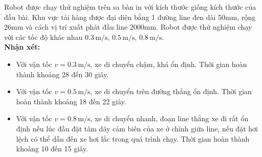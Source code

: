           \hspace*{0.6cm}Robot được chạy thử nghiệm trên sa bàn in với kích thước giống kích thước của đầu bài. Khu vực tải hàng được đại diện bằng 1 đường line đen dài 50mm, rộng 26mm và cách vị trí xuất phát đầu line 2000mm. Robot được thử nghiệm chạy với các tốc độ khác nhau $0.3 \,\mathrm{m/s}, \,  0.5 \,\mathrm{m/s}, \, 0.8 \,\mathrm{m/s}$.\\
               \hspace*{0.6cm}\textbf{Nhận xét:}
               \begin{itemize}
                    \item Với vận tốc $v = 0.3 \,\mathrm{m/s}$, xe di chuyển chậm, khá ổn định. Thời gian hoàn thành khoảng 28 đến 30 giây.
                    \item Với vận tốc $v = 0.5 \,\mathrm{m/s}$, xe di chuyển trên đường thẳng ổn định. Thời gian hoàn thành khoảng 18 đến 22 giây.
                    \item Với vận tốc $v = 0.8 \,\mathrm{m/s}$, xe di chuyển nhanh, đoạn line thẳng xe đi rất ổn định nếu lúc đầu đặt tâm dãy cảm biến của xe ở chính giữa line, nếu đặt hơi lệch có thể dẫn đến xe hơi lắc trong quá trình chạy. Thời gian hoàn thành khoảng 10 đến 15 giây.
               \end{itemize}
